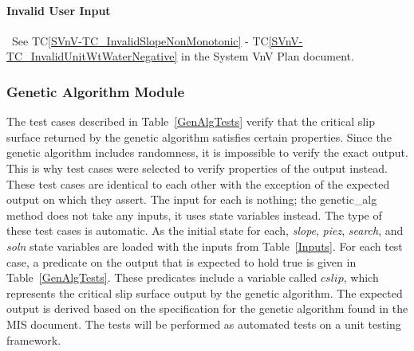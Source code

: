 \documentclass[12pt, titlepage]{article}
\newcommand{\tcref}[1]{TC\ref{#1}}
\begin{document}
\paragraph{Invalid User Input}
~\newline \noindent See \tcref{SVnV-TC_InvalidSlopeNonMonotonic} - 
\tcref{SVnV-TC_InvalidUnitWtWaterNegative} in the System VnV Plan document.

\subsubsection{Genetic Algorithm Module}

The test cases described in Table~\ref{GenAlgTests} 
verify that the critical slip surface returned by the genetic algorithm 
satisfies certain properties. Since the genetic algorithm includes randomness, 
it is impossible to verify the exact output. This is why test cases were 
selected to verify properties of the output instead. These test cases are 
identical to each other with the exception of the expected output on which they 
assert. The input for each is nothing; the genetic\_alg method does not take 
any inputs, it uses state variables instead. The type of these test cases is 
automatic. As the initial state for each, \textit{slope}, \textit{piez}, 
\textit{search}, and \textit{soln} state variables are loaded with the inputs 
from Table~\ref{Inputs}. For each test case, a predicate on the output that is 
expected to hold true is given in Table~\ref{GenAlgTests}. These 
predicates include a variable called $cslip$, which represents the critical 
slip surface output by the genetic algorithm. The expected output is derived 
based on the specification for the genetic algorithm found in the MIS document. 
The tests will be performed as automated tests on a unit testing framework.
\end{document}
